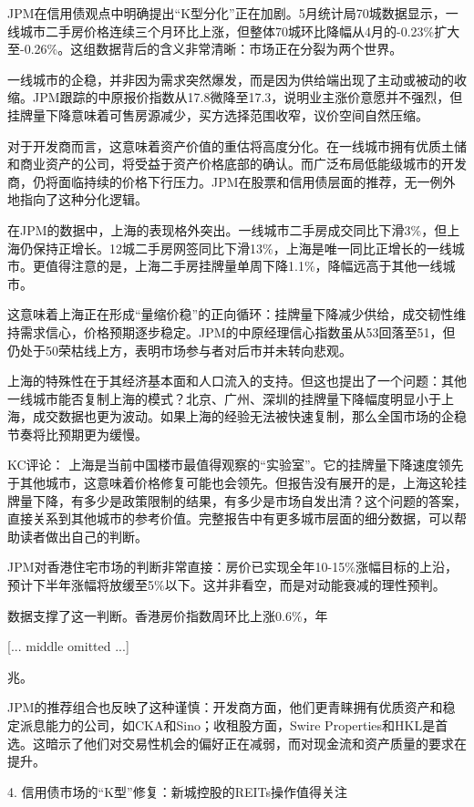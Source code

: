 \documentclass[11pt]{ctexart}
\begin{document}
JPM在信用债观点中明确提出“K型分化”正在加剧。5月统计局70城数据显示，一线城市二手房价格连续三个月环比上涨，但整体70城环比降幅从4月的-0.23\%扩大至-0.26\%。这组数据背后的含义非常清晰：市场正在分裂为两个世界。

一线城市的企稳，并非因为需求突然爆发，而是因为供给端出现了主动或被动的收缩。JPM跟踪的中原报价指数从17.8微降至17.3，说明业主涨价意愿并不强烈，但挂牌量下降意味着可售房源减少，买方选择范围收窄，议价空间自然压缩。

对于开发商而言，这意味着资产价值的重估将高度分化。在一线城市拥有优质土储和商业资产的公司，将受益于资产价格底部的确认。而广泛布局低能级城市的开发商，仍将面临持续的价格下行压力。JPM在股票和信用债层面的推荐，无一例外地指向了这种分化逻辑。

在JPM的数据中，上海的表现格外突出。一线城市二手房成交同比下滑3\%，但上海仍保持正增长。12城二手房网签同比下滑13\%，上海是唯一同比正增长的一线城市。更值得注意的是，上海二手房挂牌量单周下降1.1\%，降幅远高于其他一线城市。

这意味着上海正在形成“量缩价稳”的正向循环：挂牌量下降减少供给，成交韧性维持需求信心，价格预期逐步稳定。JPM的中原经理信心指数虽从53回落至51，但仍处于50荣枯线上方，表明市场参与者对后市并未转向悲观。

上海的特殊性在于其经济基本面和人口流入的支持。但这也提出了一个问题：其他一线城市能否复制上海的模式？北京、广州、深圳的挂牌量下降幅度明显小于上海，成交数据也更为波动。如果上海的经验无法被快速复制，那么全国市场的企稳节奏将比预期更为缓慢。

KC评论： 上海是当前中国楼市最值得观察的“实验室”。它的挂牌量下降速度领先于其他城市，这意味着价格修复可能也会领先。但报告没有展开的是，上海这轮挂牌量下降，有多少是政策限制的结果，有多少是市场自发出清？这个问题的答案，直接关系到其他城市的参考价值。完整报告中有更多城市层面的细分数据，可以帮助读者做出自己的判断。

JPM对香港住宅市场的判断非常直接：房价已实现全年10-15\%涨幅目标的上沿，预计下半年涨幅将放缓至5\%以下。这并非看空，而是对动能衰减的理性预判。

数据支撑了这一判断。香港房价指数周环比上涨0.6\%，年

[... middle omitted ...]

兆。

JPM的推荐组合也反映了这种谨慎：开发商方面，他们更青睐拥有优质资产和稳定派息能力的公司，如CKA和Sino；收租股方面，Swire Properties和HKL是首选。这暗示了他们对交易性机会的偏好正在减弱，而对现金流和资产质量的要求在提升。

4. 信用债市场的“K型”修复：新城控股的REITs操作值得关注
\end{document}

